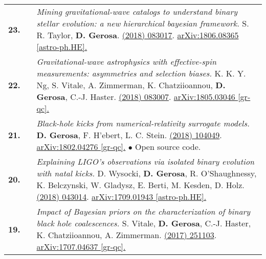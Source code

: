 {\begin{longtable}{rp{0.3cm}p{15.8cm}}
%
\textbf{23.} & & \textit{Mining gravitational-wave catalogs to understand binary stellar evolution: a new hierarchical bayesian framework.}
\newline{}
S. R. Taylor, \textbf{D. Gerosa}.
\newline{}
\href{https://journals.aps.org/prd/abstract/10.1103/PhysRevD.98.083017}{\prd 98 (2018) 083017}. \href{https://arxiv.org/abs/1806.08365}{arXiv:1806.08365 [astro-ph.HE].}
\vspace{0.09cm}\\
%
\textbf{22.} & & \textit{Gravitational-wave astrophysics with effective-spin measurements: asymmetries and selection biases.}
\newline{}
K. K. Y. Ng, S. Vitale, A. Zimmerman, K. Chatziioannou, \textbf{D. Gerosa}, C.-J. Haster.
\newline{}
\href{https://journals.aps.org/prd/abstract/10.1103/PhysRevD.98.083007}{\prd 98 (2018) 083007}. \href{https://arxiv.org/abs/1805.03046}{arXiv:1805.03046 [gr-qc].}
\vspace{0.09cm}\\
%
\textbf{21.} & & \textit{Black-hole kicks from numerical-relativity surrogate models.}
\newline{}
\textbf{D. Gerosa}, F. H'ebert, L. C. Stein.
\newline{}
\href{https://journals.aps.org/prd/abstract/10.1103/PhysRevD.97.104049}{\prd 97 (2018) 104049}. \href{https://arxiv.org/abs/1802.04276}{arXiv:1802.04276 [gr-qc].}
\newline{}
\textcolor{color1}{$\bullet$} Open source code.
\vspace{0.09cm}\\
%
\textbf{20.} & & \textit{Explaining LIGO's observations via isolated binary evolution with natal kicks.}
\newline{}
D. Wysocki, \textbf{D. Gerosa}, R. O'Shaughnessy, K. Belczynski, W. Gladysz, E. Berti, M. Kesden, D. Holz.
\newline{}
\href{https://journals.aps.org/prd/abstract/10.1103/PhysRevD.97.043014}{\prd 97 (2018) 043014}. \href{https://arxiv.org/abs/1709.01943}{arXiv:1709.01943 [astro-ph.HE].}
\vspace{0.09cm}\\
%
\textbf{19.} & & \textit{Impact of Bayesian priors on the characterization of binary black hole coalescences.}
\newline{}
S. Vitale, \textbf{D. Gerosa}, C.-J. Haster, K. Chatziioannou, A. Zimmerman.
\newline{}
\href{http://dx.doi.org/10.1103/PhysRevLett.119.251103}{\prl 119 (2017) 251103}. \href{https://arxiv.org/abs/1707.04637}{arXiv:1707.04637 [gr-qc].}

\end{longtable}}
